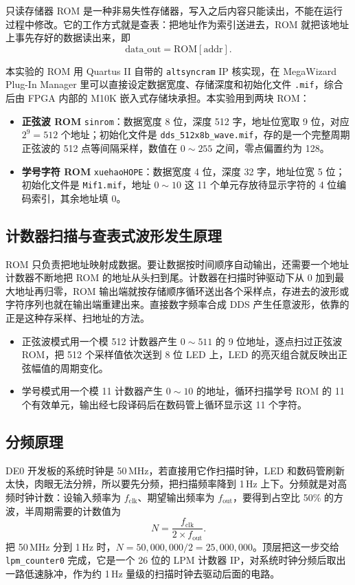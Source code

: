 \documentclass[12pt]{ctexart}
\begin{document}
只读存储器 ROM 是一种非易失性存储器，写入之后内容只能读出，不能在运行过程中修改。它的工作方式就是查表：把地址作为索引送进去，ROM 就把该地址上事先存好的数据读出来，即
\[
    \mathrm{data\_out} = \mathrm{ROM}[\mathrm{addr}].
\]

本实验的 ROM 用 Quartus II 自带的 \texttt{altsyncram} IP 核实现，在 MegaWizard Plug-In Manager 里可以直接设定数据宽度、存储深度和初始化文件 \texttt{.mif}，综合后由 FPGA 内部的 M10K 嵌入式存储块承担。本实验用到两块 ROM：

\begin{itemize}
    \item \textbf{正弦波 ROM} \texttt{sinrom}：数据宽度 8 位，深度 512 字，地址位宽取 9 位，对应 $2^9 = 512$ 个地址；初始化文件是 \texttt{dds\_512x8b\_wave.mif}，存的是一个完整周期正弦波的 512 点等间隔采样，数值在 $0\sim255$ 之间，零点偏置约为 128。
    \item \textbf{学号字符 ROM} \texttt{xuehaoHOPE}：数据宽度 4 位，深度 32 字，地址位宽 5 位；初始化文件是 \texttt{Mif1.mif}，地址 $0\sim10$ 这 11 个单元存放待显示字符的 4 位编码索引，其余地址填 0。
\end{itemize}

\subsection{计数器扫描与查表式波形发生原理}

ROM 只负责把地址映射成数据。要让数据按时间顺序自动输出，还需要一个地址计数器不断地把 ROM 的地址从头扫到尾。计数器在扫描时钟驱动下从 0 加到最大地址再归零，ROM 输出端就按存储顺序循环送出各个采样点，存进去的波形或字符序列也就在输出端重建出来。直接数字频率合成 DDS 产生任意波形，依靠的正是这种存采样、扫地址的方法。

\begin{itemize}
    \item 正弦波模式用一个模 512 计数器产生 $0\sim511$ 的 9 位地址，逐点扫过正弦波 ROM，把 512 个采样值依次送到 8 位 LED 上，LED 的亮灭组合就反映出正弦幅值的周期变化。
    \item 学号模式用一个模 11 计数器产生 $0\sim10$ 的地址，循环扫描学号 ROM 的 11 个有效单元，输出经七段译码后在数码管上循环显示这 11 个字符。
\end{itemize}

\subsection{分频原理}

DE0 开发板的系统时钟是 50\,MHz，若直接用它作扫描时钟，LED 和数码管刷新太快，肉眼无法分辨，所以要先分频，把扫描频率降到 1\,Hz 上下。分频就是对高频时钟计数：设输入频率为 $f_{\text{clk}}$、期望输出频率为 $f_{\text{out}}$，要得到占空比 50\% 的方波，半周期需要的计数值为
\[
    N = \frac{f_{\text{clk}}}{2 \times f_{\text{out}}}.
\]
把 50\,MHz 分到 1\,Hz 时，$N = 50{,}000{,}000 / 2 = 25{,}000{,}000$。顶层把这一步交给 \texttt{lpm\_counter0} 完成，它是一个 26 位的 LPM 计数器 IP，对系统时钟分频后取出一路低速脉冲，作为约 1\,Hz 量级的扫描时钟去驱动后面的电路。
\end{document}
